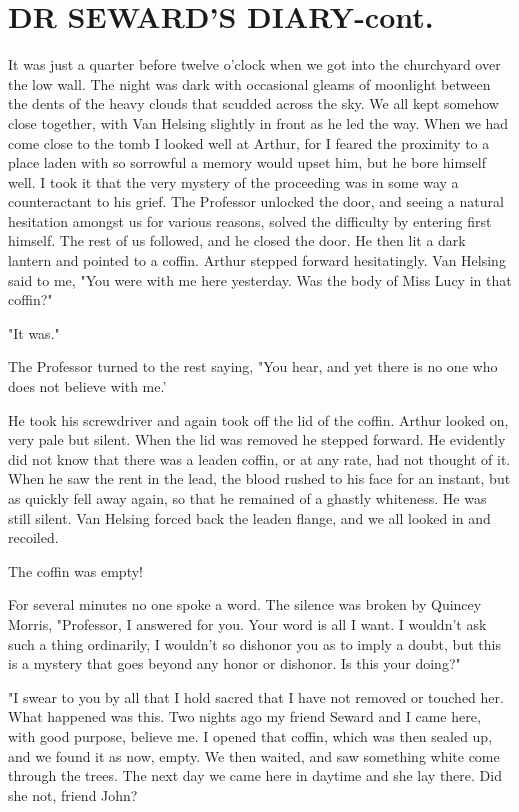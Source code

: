 \chapter{DR SEWARD'S DIARY-cont.}

It was just a quarter before twelve o'clock when we got into the churchyard over the low wall. The night was dark with occasional gleams of moonlight between the dents of the heavy clouds that scudded across the sky. We all kept somehow close together, with Van Helsing slightly in front as he led the way. When we had come close to the tomb I looked well at Arthur, for I feared the proximity to a place laden with so sorrowful a memory would upset him, but he bore himself well. I took it that the very mystery of the proceeding was in some way a counteractant to his grief. The Professor unlocked the door, and seeing a natural hesitation amongst us for various reasons, solved the difficulty by entering first himself. The rest of us followed, and he closed the door. He then lit a dark lantern and pointed to a coffin. Arthur stepped forward hesitatingly. Van Helsing said to me, "You were with me here yesterday. Was the body of Miss Lucy in that coffin?" 

"It was." 

The Professor turned to the rest saying, "You hear, and yet there is no one who does not believe with me.' 

He took his screwdriver and again took off the lid of the coffin. Arthur looked on, very pale but silent. When the lid was removed he stepped forward. He evidently did not know that there was a leaden coffin, or at any rate, had not thought of it. When he saw the rent in the lead, the blood rushed to his face for an instant, but as quickly fell away again, so that he remained of a ghastly whiteness. He was still silent. Van Helsing forced back the leaden flange, and we all looked in and recoiled. 

The coffin was empty! 

For several minutes no one spoke a word. The silence was broken by Quincey Morris, "Professor, I answered for you. Your word is all I want. I wouldn't ask such a thing ordinarily, I wouldn't so dishonor you as to imply a doubt, but this is a mystery that goes beyond any honor or dishonor. Is this your doing?" 

"I swear to you by all that I hold sacred that I have not removed or touched her. What happened was this. Two nights ago my friend Seward and I came here, with good purpose, believe me. I opened that coffin, which was then sealed up, and we found it as now, empty. We then waited, and saw something white come through the trees. The next day we came here in daytime and she lay there. Did she not, friend John? 

